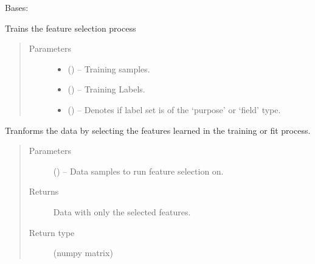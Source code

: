 \documentclass[letterpaper,10pt,english]{sphinxmanual}
\begin{document}
\begin{fulllineitems}
\label{\detokenize{KUHERD:KUHERD.MultiFeatureSelector.MultiFeatureSelector}}
Bases: 

\begin{fulllineitems}
\label{\detokenize{KUHERD:KUHERD.MultiFeatureSelector.MultiFeatureSelector.fit}}
Trains the feature selection process
\begin{quote}\begin{description}
\item[{Parameters}] \leavevmode\begin{itemize}
\item {} 
 () -- Training samples.

\item {} 
 () -- Training Labels.

\item {} 
 () -- Denotes if label set is of the `purpose' or `field' type.

\end{itemize}

\end{description}\end{quote}

\end{fulllineitems}


\begin{fulllineitems}
\label{\detokenize{KUHERD:KUHERD.MultiFeatureSelector.MultiFeatureSelector.transform}}
Tranforms the data by selecting the features learned in the training or \sphinxquotedblleft{}fit\sphinxquotedblright{} process.
\begin{quote}\begin{description}
\item[{Parameters}] \leavevmode
{} () -- Data samples to run feature selection on.

\item[{Returns}] \leavevmode
Data with only the selected features.

\item[{Return type}] \leavevmode
(numpy matrix)

\end{description}\end{quote}

\end{fulllineitems}


\end{fulllineitems}
\end{document}
